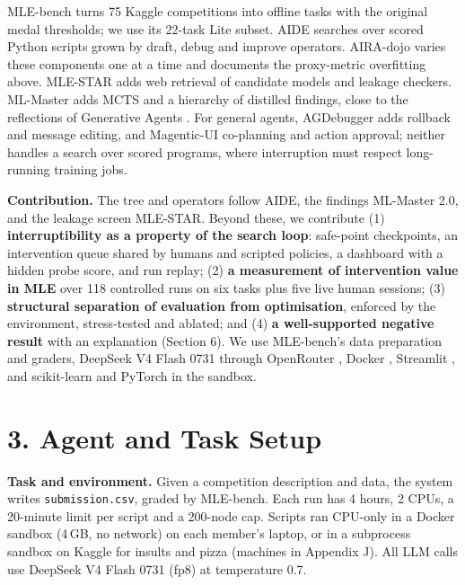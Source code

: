 \documentclass[11pt]{article}
\begin{document}
MLE-bench \cite{mlebench} turns 75 Kaggle competitions into offline tasks with the
original medal thresholds; we use its 22-task Lite subset. AIDE \cite{aide} searches over
scored Python scripts grown by draft, debug and improve operators. AIRA-dojo \cite{aira}
varies these components one at a time and documents the proxy-metric overfitting
above. MLE-STAR \cite{mlestar} adds web retrieval of candidate models and leakage
checkers. ML-Master \cite{mlmaster,mlmaster2} adds MCTS and a hierarchy of distilled
findings, close to the reflections of Generative Agents \cite{genagents}. For general
agents, AGDebugger \cite{agdebugger} adds rollback and message editing, and
Magentic-UI \cite{magentic} co-planning and action approval; neither handles a search
over scored programs, where interruption must respect long-running training jobs.

\textbf{Contribution.} The tree and operators follow AIDE, the findings ML-Master 2.0,
and the leakage screen MLE-STAR. Beyond these, we contribute (1)
\textbf{interruptibility as a property of the search loop}: safe-point checkpoints, an
intervention queue shared by humans and scripted policies, a dashboard with a hidden
probe score, and run replay; (2) \textbf{a measurement of intervention value in MLE}
over 118 controlled runs on six tasks plus five live human sessions; (3) \textbf{structural separation of
evaluation from optimisation}, enforced by the environment, stress-tested and
ablated; and (4) \textbf{a well-supported negative result} with an explanation
(Section 6). We use MLE-bench's data preparation and graders, DeepSeek V4 Flash 0731
\cite{deepseek} through OpenRouter \cite{openrouter}, Docker \cite{docker}, Streamlit
\cite{streamlit}, and scikit-learn \cite{sklearn} and PyTorch \cite{pytorch} in the
sandbox.

\section*{3. Agent and Task Setup}

\textbf{Task and environment.} Given a competition description and data, the system
writes \texttt{submission.csv}, graded by MLE-bench. Each run has 4 hours, 2 CPUs, a
20-minute limit per script and a 200-node cap. Scripts ran CPU-only in a Docker sandbox (4\,GB, no
network) on each member's laptop, or in a subprocess sandbox on Kaggle for insults and
pizza (machines in Appendix J). All LLM calls use DeepSeek V4 Flash 0731 (fp8) at temperature 0.7.
\end{document}
